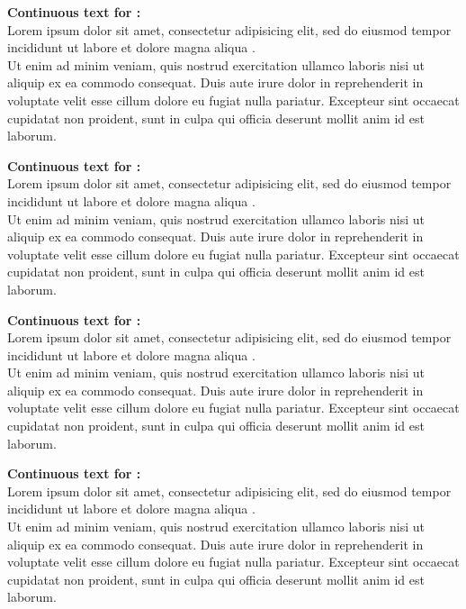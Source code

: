 \documentclass{scrartcl}
\begin{document}


\noindent\textbf{\textsf{Continuous text for} :}\\
Lorem ipsum dolor sit amet, consectetur adipisicing elit, 
sed \crotchet do eiusmod tempor incididunt ut labore et dolore magna aliqua \crotchet*.\\
\crotchet Ut enim ad minim veniam, quis nostrud exercitation ullamco laboris nisi ut aliquip 
ex ea commodo consequat. Duis aute irure dolor in reprehenderit in voluptate velit esse 
cillum dolore eu fugiat nulla pariatur\crotchet. 
\crotchet Excepteur sint occaecat cupidatat non proident, sunt in culpa qui officia deserunt mollit anim id est laborum.

\bigskip


\noindent\textbf{\textsf{Continuous text for} :}\\
Lorem ipsum dolor sit amet, consectetur adipisicing elit, 
sed \halfNote do eiusmod tempor incididunt ut labore et dolore magna aliqua \halfNote*.\\
\halfNote Ut enim ad minim veniam, quis nostrud exercitation ullamco laboris nisi ut aliquip 
ex ea commodo consequat. Duis aute irure dolor in reprehenderit in voluptate velit esse 
cillum dolore eu fugiat nulla pariatur\halfNote. 
\halfNote Excepteur sint occaecat cupidatat non proident, sunt in culpa qui officia deserunt mollit anim id est laborum.

\bigskip


\noindent\textbf{\textsf{Continuous text for} :}\\
Lorem ipsum dolor sit amet, consectetur adipisicing elit, 
sed \quaver do eiusmod tempor incididunt ut labore et dolore magna aliqua \quaver*.\\
\quaver Ut enim ad minim veniam, quis nostrud exercitation ullamco laboris nisi ut aliquip 
ex ea commodo consequat. Duis aute irure dolor in reprehenderit in voluptate velit esse 
cillum dolore eu fugiat nulla pariatur\quaver. 
\quaver Excepteur sint occaecat cupidatat non proident, sunt in culpa qui officia deserunt mollit anim id est laborum.

\bigskip


\noindent\textbf{\textsf{Continuous text for} :}\\
Lorem ipsum dolor sit amet, consectetur adipisicing elit, 
sed \semiquaver do eiusmod tempor incididunt ut labore et dolore magna aliqua \semiquaver*.\\
\semiquaver Ut enim ad minim veniam, quis nostrud exercitation ullamco laboris nisi ut aliquip 
ex ea commodo consequat. Duis aute irure dolor in reprehenderit in voluptate velit esse 
cillum dolore eu fugiat nulla pariatur\semiquaver. 
\semiquaver Excepteur sint occaecat cupidatat non proident, sunt in culpa qui officia deserunt mollit anim id est laborum.

\bigskip
\end{document}
